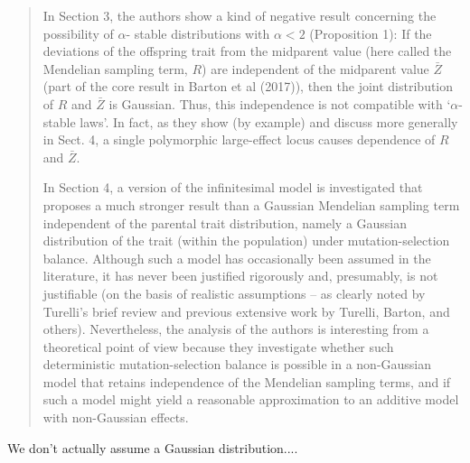 \begin{quote}
In Section 3, the authors show a kind of negative result concerning the possibility of $\alpha$-
stable distributions with $\alpha < 2$ (Proposition 1): If the deviations of the offspring trait
from the midparent value (here called the Mendelian sampling term, $R$) are independent
of the midparent value $\bar Z$ (part of the core result in Barton et al (2017)), then the joint
distribution of $R$ and $\bar Z$ is Gaussian. Thus, this independence is not compatible with ‘$\alpha$-
stable laws’. In fact, as they show (by example) and discuss more generally in Sect. 4, a
single polymorphic large-effect locus causes dependence of $R$ and $\bar Z$.

In Section 4, a version of the infinitesimal model is investigated that proposes a much
stronger result than a Gaussian Mendelian sampling term independent of the parental
trait distribution, namely a Gaussian distribution of the trait (within the population)
under mutation-selection balance. Although such a model has occasionally been assumed
in the literature, it has never been justified rigorously and, presumably, is not justifiable
(on the basis of realistic assumptions – as clearly noted by Turelli’s brief review and
previous extensive work by Turelli, Barton, and others). Nevertheless, the analysis of the
authors is interesting from a theoretical point of view because they investigate whether
such deterministic mutation-selection balance is possible in a non-Gaussian model that
retains independence of the Mendelian sampling terms, and if such a model might yield a
reasonable approximation to an additive model with non-Gaussian effects.
\end{quote}

We don't actually assume a Gaussian distribution....

